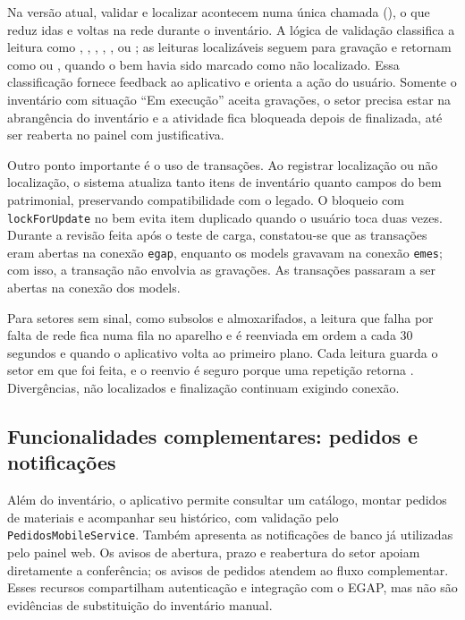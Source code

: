 \documentclass[12pt,a4paper]{article}
\begin{document}
Na versão atual, validar e localizar acontecem numa única chamada (), o que reduz idas e voltas na rede durante o inventário. A lógica de validação classifica a leitura como , , , , ,  ou ; as leituras localizáveis seguem para gravação e retornam como  ou , quando o bem havia sido marcado como não localizado. Essa classificação fornece feedback ao aplicativo e orienta a ação do usuário. Somente o inventário com situação ``Em execução'' aceita gravações, o setor precisa estar na abrangência do inventário e a atividade fica bloqueada depois de finalizada, até ser reaberta no painel com justificativa.

Outro ponto importante é o uso de transações. Ao registrar localização ou não localização, o sistema atualiza tanto itens de inventário quanto campos do bem patrimonial, preservando compatibilidade com o legado. O bloqueio com \texttt{lockForUpdate} no bem evita item duplicado quando o usuário toca duas vezes. Durante a revisão feita após o teste de carga, constatou-se que as transações eram abertas na conexão \texttt{egap}, enquanto os models gravavam na conexão \texttt{emes}; com isso, a transação não envolvia as gravações. As transações passaram a ser abertas na conexão dos models.

Para setores sem sinal, como subsolos e almoxarifados, a leitura que falha por falta de rede fica numa fila no aparelho e é reenviada em ordem a cada 30 segundos e quando o aplicativo volta ao primeiro plano. Cada leitura guarda o setor em que foi feita, e o reenvio é seguro porque uma repetição retorna . Divergências, não localizados e finalização continuam exigindo conexão.

\subsection{Funcionalidades complementares: pedidos e notificações}

Além do inventário, o aplicativo permite consultar um catálogo, montar pedidos de materiais e acompanhar seu histórico, com validação pelo \texttt{PedidosMobileService}. Também apresenta as notificações de banco já utilizadas pelo painel web. Os avisos de abertura, prazo e reabertura do setor apoiam diretamente a conferência; os avisos de pedidos atendem ao fluxo complementar. Esses recursos compartilham autenticação e integração com o EGAP, mas não são evidências de substituição do inventário manual.
\end{document}
